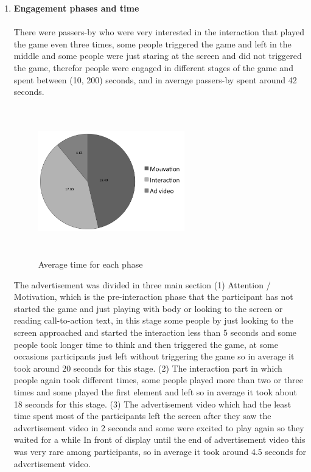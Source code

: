 \begin{enumerate}
\item \textbf{Engagement phases and time} \\
\\
There were passers-by who were very interested in the interaction that played the game even three times, some people triggered the game and left in the middle and some people were just staring at the screen and did not triggered the game, therefor people were engaged in different stages of the game and spent between (10, 200) seconds, and in average passers-by spent around 42 seconds.

\begin{figure}[H]
    \centering
    \includegraphics[width=0.6\textwidth,height=6.5cm]{Figures/8/body_inter_findings/body_avg_phases}
    \caption{Average time for each phase}%
    \label{fig:bodyaveragephases}%
\end{figure}

The advertisement was divided in three main section (1) Attention / Motivation, which is the pre-interaction phase that the participant has not started the game and just playing with body or looking to the screen or reading call-to-action text, in this stage some people by just looking to the screen approached and started the interaction less than 5 seconds and some people took longer time to think and then triggered the game, at some occasions participants just left without triggering the game so in average it took around 20 seconds for this stage. (2) The interaction part in which people again took different times, some people played more than two or three times and some played the first element and left so in average it took about 18 seconds for this stage. (3) The advertisement video which had the least time spent most of the participants left the screen after they saw the advertisement video in 2 seconds and some were excited to play again so they waited for a while In front of display until the end of advertisement video this was very rare among participants, so in average it took around 4.5 seconds for advertisement video.



\end{enumerate}
